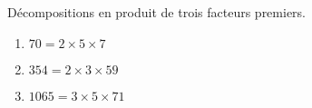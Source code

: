     Décompositions en produit de trois facteurs premiers.
    \begin{enumerate}
        \item $70=2\times 5\times 7$
        \item $354=2\times 3\times 59$
        \item $\num{1065}=3\times 5\times 71$
    \end{enumerate}

